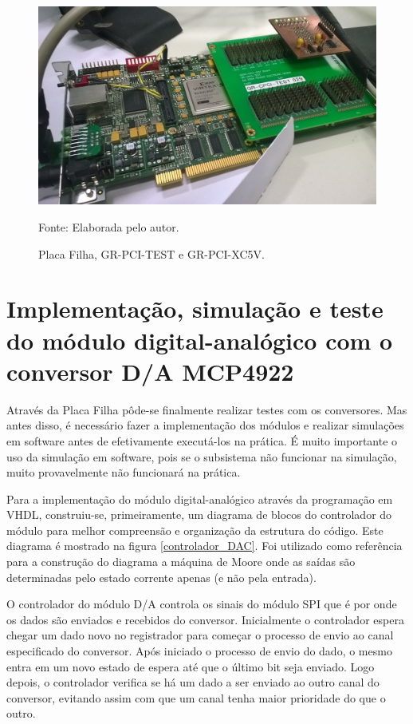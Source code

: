 \begin{figure}[H]
	\centering
	\caption{Placa Filha, GR-PCI-TEST e GR-PCI-XC5V.}
	\includegraphics[scale = .8, angle = 90]{Imagens/PlacaFilha_GRPCI}
	
	Fonte: Elaborada pelo autor.
	
	\label{PlacaFilha_GRPCI}
\end{figure}


\section{Implementação, simulação e teste do módulo digital-analógico com o conversor D/A MCP4922}

Através da Placa Filha pôde-se finalmente realizar testes com os conversores. Mas antes disso, é necessário fazer a implementação dos módulos e realizar simulações em software antes de efetivamente executá-los na prática. É muito importante o uso da simulação em software, pois se o subsistema não funcionar na simulação, muito provavelmente não funcionará na prática.

Para a implementação do módulo digital-analógico através da programação em VHDL, construiu-se, primeiramente, um diagrama de blocos do controlador do módulo para melhor compreensão e organização da estrutura do código. Este diagrama é mostrado na figura \ref{controlador_DAC}. Foi utilizado como referência para a construção do diagrama a máquina de Moore onde as saídas são determinadas pelo estado corrente apenas (e não pela entrada). 

O controlador do módulo D/A controla os sinais do módulo SPI que é por onde os dados são enviados e recebidos do conversor. Inicialmente o controlador espera chegar um dado novo no registrador para começar o processo de envio ao canal especificado do conversor. Após iniciado o processo de envio do dado, o mesmo entra em um novo estado de espera até que o último bit seja enviado. Logo depois, o controlador verifica se há um dado a ser enviado ao outro canal do conversor, evitando assim com que um canal tenha maior prioridade do que o outro.

